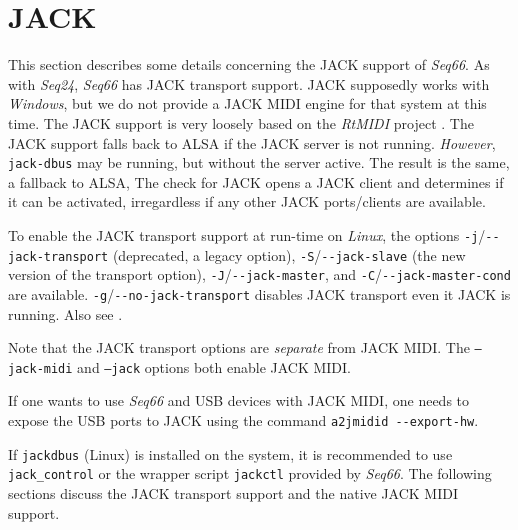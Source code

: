 %
%
%

\section{JACK}
\label{sec:jack}

   This section describes some details concerning the JACK support of
   \textsl{Seq66}.
   As with \textsl{Seq24}, \textsl{Seq66} has JACK transport support.
   JACK supposedly works with \textsl{Windows}, but we do not provide a JACK
   MIDI engine for that system at this time.
   The JACK support is very loosely based on the \textsl{RtMIDI} project
   \cite{rtmidi}.
   The JACK support falls back to ALSA if the JACK server is not running.
   \textsl{However}, \texttt{jack-dbus} may be running, but without the
   server active. The result is the same, a fallback to ALSA,
   The check for JACK opens a JACK client and determines if it can be
   activated, irregardless if any other JACK ports/clients are available.

   To enable the JACK transport support at run-time on
   \textsl{Linux}, the options
   \texttt{-j}/\texttt{-{}-jack-transport} (deprecated, a legacy option),
   \texttt{-S}/\texttt{-{}-jack-slave} (the new version of the transport
   option),
   \texttt{-J}/\texttt{-{}-jack-master},
   and \texttt{-C}/\texttt{-{}-jack-master-cond} are available.
   \texttt{-g}/\texttt{-{}-no-jack-transport}
   disables JACK transport even it JACK is running.
   Also see .

   Note that the JACK transport options are \textsl{separate} from JACK MIDI.
   The \texttt{--jack-midi} and \texttt{--jack} options both
   enable JACK MIDI.

   If one wants to use \textsl{Seq66} and USB devices
   with JACK MIDI, one needs to expose the USB ports to JACK using the
   command \texttt{a2jmidid -{}-export-hw}.

   If \texttt{jackdbus} (Linux) is installed on the system, it is recommended
   to use \texttt{jack\_control} or the wrapper script \texttt{jackctl}
   provided by \textsl{Seq66}.
   The following sections discuss the JACK transport support and the native
   JACK MIDI support.

